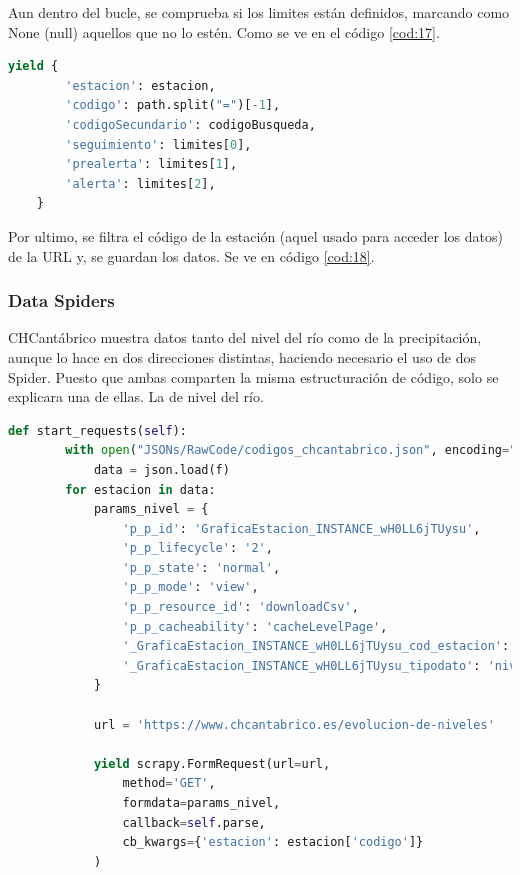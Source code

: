 Aun dentro del bucle, se comprueba si los limites están definidos, marcando como None (null) aquellos que no lo estén. Como se ve en el código \ref{cod:17}.

\begin{lstlisting}[language=Python, caption={Guardado de datos de CHCantábrico Code Spider}, label=cod:18]
	yield {
		'estacion': estacion,
		'codigo': path.split("=")[-1],
		'codigoSecundario': codigoBusqueda,
		'seguimiento': limites[0],
		'prealerta': limites[1],
		'alerta': limites[2],
	}
\end{lstlisting}

Por ultimo, se filtra el código de la estación (aquel usado para acceder los datos) de la URL y, se guardan los datos. Se ve en código \ref{cod:18}.

\subsubsection{Data Spiders}
CHCantábrico muestra datos tanto del nivel del río como de la precipitación, aunque lo hace en dos direcciones distintas, haciendo necesario el uso de dos Spider. Puesto que ambas comparten la misma estructuración de código, solo se explicara una de ellas. La de nivel del río.

\begin{lstlisting}[language=Python, caption={Función \textit{start\_requests()} CHCantábrico Nivel Spider}, label=cod:19]
	def start_requests(self):
		with open("JSONs/RawCode/codigos_chcantabrico.json", encoding="utf-8") as f:
			data = json.load(f)
		for estacion in data:
			params_nivel = {
				'p_p_id': 'GraficaEstacion_INSTANCE_wH0LL6jTUysu',
				'p_p_lifecycle': '2',
				'p_p_state': 'normal',
				'p_p_mode': 'view',
				'p_p_resource_id': 'downloadCsv',
				'p_p_cacheability': 'cacheLevelPage',
				'_GraficaEstacion_INSTANCE_wH0LL6jTUysu_cod_estacion': f'{estacion["codigo"]}',
				'_GraficaEstacion_INSTANCE_wH0LL6jTUysu_tipodato': 'nivel',
			}
		
			url = 'https://www.chcantabrico.es/evolucion-de-niveles'
			
			yield scrapy.FormRequest(url=url,
				method='GET',
				formdata=params_nivel,
				callback=self.parse,
				cb_kwargs={'estacion': estacion['codigo']}
			)
\end{lstlisting}

